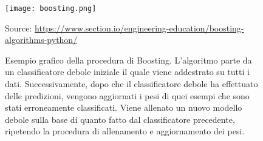 \begin{figure}[h]
	\begin{center}
		\texttt{[image: boosting.png]}
		\caption{Esempio grafico della procedura di Boosting. L'algoritmo parte da un classificatore debole iniziale il quale viene addestrato su tutti i dati. Successivamente, dopo che il classificatore debole ha effettuato delle predizioni, vengono aggiornati i pesi di quei esempi che sono stati erroneamente classificati. Viene allenato un nuovo modello debole sulla base di quanto fatto dal classificatore precedente, ripetendo la procedura di allenamento e aggiornamento dei pesi.
		} 
		Source: \url{https://www.section.io/engineering-education/boosting-algorithms-python/}\label{fig:boosting}
	\end{center}
\end{figure}

